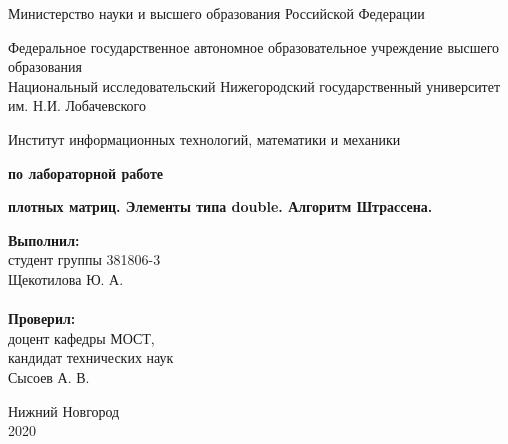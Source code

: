 \documentclass{report}
\begin{document}
\begin{titlepage}

\begin{center}
Министерство науки и высшего образования Российской Федерации
\end{center}

\begin{center}
Федеральное государственное автономное образовательное учреждение высшего образования \\
Национальный исследовательский Нижегородский государственный университет им. Н.И. Лобачевского
\end{center}

\begin{center}
Институт информационных технологий, математики и механики
\end{center}

\vspace{4em}

\begin{center}
\textbf{ по лабораторной работе} \\
\end{center}
\begin{center}
\textbf{ плотных матриц. Элементы типа double. Алгоритм Штрассена.} \\
\end{center}

\vspace{4em}

\newbox{\lbox}
\newlength{\maxl}
\setlength{\maxl}{\wd\lbox}
\hfill\parbox{7cm}{
\hspace*{5cm}\hspace*{-5cm}\textbf{Выполнил:} \\ студент группы 381806-3 \\ Щекотилова Ю. А.\\
\\
\hspace*{5cm}\hspace*{-5cm}\textbf{Проверил:}\\ доцент кафедры МОСТ, \\ кандидат технических наук \\ Сысоев А. В.\\
}
\vspace{\fill}

\begin{center} Нижний Новгород \\ 2020 \end{center}

\end{titlepage}
\end{document}
